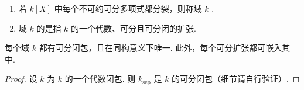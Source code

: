 \begin{definition*}
\begin{enumerate}[label=\roman*)]
\item 若 $k[X]$ 中每个不可约可分多项式都分裂，则称域 $k$ .
\item 域 $k$ 的是指 $k$ 的一个代数、可分且可分闭的扩张.
\end{enumerate}
\end{definition*}
\begin{proposition*}
每个域 $k$ 都有可分闭包，且在同构意义下唯一. 此外，每个可分扩张都可嵌入其中.
\end{proposition*}
\begin{proof}
设 $\overline k$ 为 $k$ 的一个代数闭包. 则 $\overline k_{\mathrm{sep}}$ 是 $k$ 的可分闭包（细节请自行验证）.
\end{proof}

